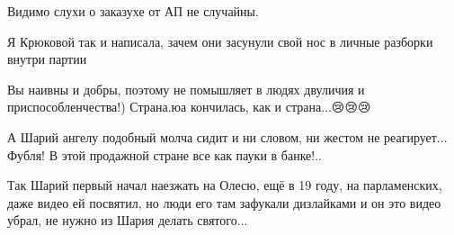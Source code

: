 \begin{itemize}
 
Видимо слухи о заказухе от АП не случайны.

 
Я Крюковой так и написала, зачем они засунули свой нос в личные разборки внутри партии

 
Вы наивны и добры, поэтому не помышляет в людях двуличия и приспособленчества!) Страна.юа кончилась, как и страна...😢😢😢

 
А Шарий ангелу подобный молча сидит и ни словом, ни жестом не реагирует... Фубля! В этой продажной стране все как пауки в банке!..

 

Так Шарий первый начал наезжать на Олесю, ещё в 19 году, на парламенских, даже
видео ей посвятил, но люди его там зафукали дизлайками и он это видео убрал, не
нужно из Шария делать святого...

 


\end{itemize}
